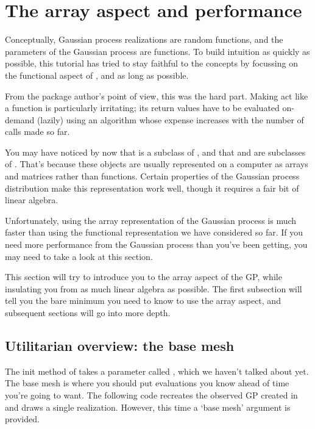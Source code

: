 \documentclass{manual}
\begin{document}
\section{The array aspect and performance}\label{sec:array} %
Conceptually, Gaussian process realizations are random functions, and the parameters of the Gaussian process are functions. To build intuition as quickly as possible, this tutorial has tried to stay faithful to the concepts by focussing on the functional aspect of ,  and  as long as possible. 

From the package author's point of view, this was the hard part. Making  act like a function is particularly irritating; its return values have to be evaluated on-demand (lazily) using an algorithm whose expense increases with the number of calls made so far.

You may have noticed by now that  is a subclass of , and that  and  are subclasses of . That's because these objects are usually represented on a computer as arrays and matrices rather than functions. Certain properties of the Gaussian process distribution make this representation work well, though it requires a fair bit of linear algebra. 

Unfortunately, using the array representation of the Gaussian process is much faster than using the functional representation we have considered so far. If you need more performance from the Gaussian process than you've been getting, you may need to take a look at this section.

This section will try to introduce you to the array aspect of the GP, while insulating you from as much linear algebra as possible. The first subsection will tell you the bare minimum you need to know to use the array aspect, and subsequent sections will go into more depth.

\subsection{Utilitarian overview: the base mesh}

The init method of  takes a parameter called , which we haven't talked about yet. The base mesh is where you should put evaluations you know ahead of time you're going to want. The following code recreates the observed GP created in  and draws a single realization. However, this time a `base mesh' argument is provided.

\end{document}
